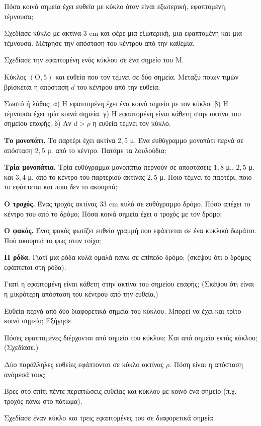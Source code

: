 \ex Πόσα κοινά σημεία έχει ευθεία με κύκλο όταν είναι εξωτερική, εφαπτομένη, τέμνουσα;

\ex Σχεδίασε κύκλο με ακτίνα $3$ cm και φέρε μια εξωτερική, μια εφαπτομένη και μια τέμνουσα. Μέτρησε την απόσταση του κέντρου από την καθεμία.

\ex Σχεδίασε την εφαπτομένη ενός κύκλου σε ένα σημείο του $\mathrm{Μ}$.

\ex Κύκλος $(\mathrm{Ο},5)$ και ευθεία που τον τέμνει σε δύο σημεία. Μεταξύ ποιων τιμών βρίσκεται η απόσταση $d$ του κέντρου από την ευθεία;

\ex Σωστό ή λάθος; α) Η εφαπτομένη έχει ένα κοινό σημείο με τον κύκλο. \quad β) Η τέμνουσα έχει τρία κοινά σημεία. \quad γ) Η εφαπτομένη είναι κάθετη στην ακτίνα του σημείου επαφής. \quad δ) Αν $d>\rho$ η ευθεία τέμνει τον κύκλο.


\ex \textbf{Το μονοπάτι.} Το παρτέρι έχει ακτίνα $2{,}5$ μ. Ένα ευθύγραμμο μονοπάτι περνά σε απόσταση $2{,}5$ μ. από το κέντρο. Πατάμε τα λουλούδια;

\ex \textbf{Τρία μονοπάτια.} Τρία ευθύγραμμα μονοπάτια περνούν σε αποστάσεις $1{,}8$ μ., $2{,}5$ μ. και $3{,}4$ μ. από το κέντρο του παρτεριού ακτίνας $2{,}5$ μ. Ποιο τέμνει το παρτέρι, ποιο το εφάπτεται και ποιο δεν το ακουμπά;

\ex \textbf{Ο τροχός.} Ένας τροχός ακτίνας $33$ cm κυλά σε ευθύγραμμο δρόμο. Πόσο απέχει το κέντρο του από το δρόμο; Πόσα κοινά σημεία έχει ο τροχός με τον δρόμο;

\ex \textbf{Ο φακός.} Ένας φακός φωτίζει ευθεία γραμμή που εφάπτεται σε ένα κυκλικό δωμάτιο. Πού ακουμπά το φως στον τοίχο;

\ex \textbf{Η ρόδα.} Γιατί μια ρόδα κυλά ομαλά πάνω σε επίπεδο δρόμο; (σκέψου ότι ο δρόμος εφάπτεται στη ρόδα).


\ex Γιατί η εφαπτομένη είναι κάθετη στην ακτίνα του σημείου επαφής; (Σκέψου ότι είναι η μικρότερη απόσταση του κέντρου από την ευθεία.)

\ex Ευθεία περνά από δύο διαφορετικά σημεία του κύκλου. Μπορεί να έχει και τρίτο κοινό σημείο; Εξήγησε.

\ex Πόσες εφαπτομένες διέρχονται από σημείο του κύκλου; Και από σημείο εκτός κύκλου; (Σχεδίασε.)

\ex Δύο παράλληλες ευθείες εφάπτονται σε κύκλο ακτίνας $\rho$. Πόση είναι η απόσταση ανάμεσά τους;


\ex Βρες στο σπίτι πέντε περιπτώσεις ευθείας και κύκλου με κοινό ένα σημείο (π.χ. τροχός πάνω στο πάτωμα).

\ex Σχεδίασε έναν κύκλο και τρεις εφαπτομένες του σε διαφορετικά σημεία.
